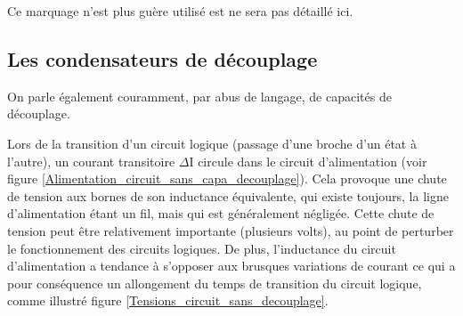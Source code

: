 \documentclass[a4paper]{article}
\begin{document}
Ce marquage n'est plus guère utilisé est ne sera pas détaillé ici.

\subsection{Les condensateurs de découplage}


On parle également couramment, par abus de langage, de capacités de découplage.

Lors de la transition d'un circuit logique (passage d'une broche d'un état à l'autre), un courant transitoire $\Delta$I circule dans le circuit d'alimentation (voir figure  \ref{Alimentation_circuit_sans_capa_decouplage}). Cela provoque une chute de tension aux bornes de son inductance équivalente, qui existe toujours, la ligne d'alimentation étant un fil, mais qui est généralement négligée. Cette chute de tension peut être relativement importante (plusieurs volts), au point de perturber le fonctionnement des circuits logiques. De plus, l'inductance du circuit d'alimentation a tendance à s'opposer aux brusques variations de courant ce qui a pour conséquence un allongement du temps de transition du circuit logique, comme illustré figure \ref{Tensions_circuit_sans_decouplage}.
\end{document}
